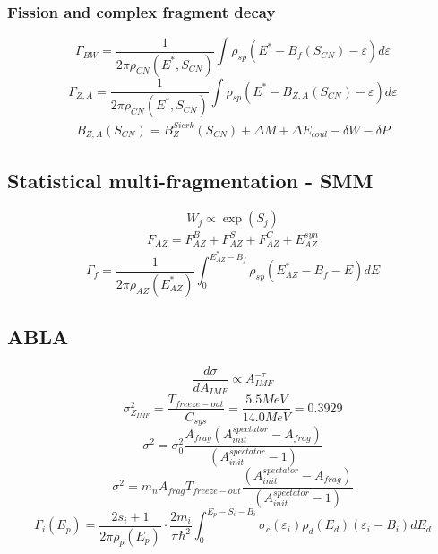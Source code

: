 \subsubsection{Fission and complex fragment decay}
\begin{equation}
	\Gamma_{BW}=\frac{1}{2\pi\rho_{CN}\left(E^*,S_{CN}\right)}\int \rho_{sp}\left(E^*-B_f\left(S_{CN}\right)-\varepsilon\right)d\varepsilon
\end{equation}
\begin{equation}
	\Gamma_{Z,A}=\frac{1}{2\pi\rho_{CN}\left(E^*,S_{CN}\right)}\int \rho_{sp}\left(E^*-B_{Z,A}\left(S_{CN}\right)-\varepsilon\right)d\varepsilon
\end{equation}
\begin{align}
	B_{Z,A}\left(S_{CN}\right)=B_{Z}^{Sierk}\left(S_{CN}\right)+\Delta M+\Delta E_{coul}-\delta W-\delta P
\end{align}
\subsection{Statistical multi-fragmentation - SMM}
\begin{equation}
	W_j\propto \exp(S_j)
\end{equation}
\begin{align}
	F_{AZ}=F_{AZ}^{B}+F_{AZ}^{S}+F_{AZ}^{C}+E_{AZ}^{syn}
\end{align}
\begin{equation}
	\Gamma_{f}=\frac{1}{2\pi\rho_{AZ}\left(E^*_{AZ}\right)}\int_{0}^{E^*_{AZ}-B_f} \rho_{sp}\left(E^*_{AZ}-B_{f}-E\right)dE
\end{equation}
\subsection{ABLA}
\begin{equation}
	\frac{d\sigma}{dA_{IMF}}\propto A_{IMF}^{-\tau}
\end{equation}
\begin{equation}
	\sigma_{Z_{IMF}}^{2}=\frac{T_{freeze-out}}{C_{sys}} =\frac{5.5MeV}{14.0 MeV}=0.3929
\end{equation}
\begin{equation}
	\sigma^{2}=\sigma^{2}_0\frac{A_{frag}\left(A_{init}^{spectator}-A_{frag}\right)}{\left(A_{init}^{spectator}-1\right)} 
\end{equation}
\begin{equation}
	\sigma^{2}=m_n A_{frag} T_{freeze-out} \frac{\left(A_{init}^{spectator}-A_{frag}\right)}{\left(A_{init}^{spectator}-1\right)} 
\end{equation}
\begin{equation}
	\Gamma_{i}\left(E_p\right)=\frac{2s_i+1}{2\pi\rho_{p}\left(E_{p}\right)}\cdot\frac{2m_i}{\pi\hbar^{2}}  \int_0^{E_p-S_i-B_i} \sigma_{c}\left(\varepsilon_i\right)\rho_{d}\left(E_d\right)\left(\varepsilon_i-B_i\right)dE_d
\end{equation}